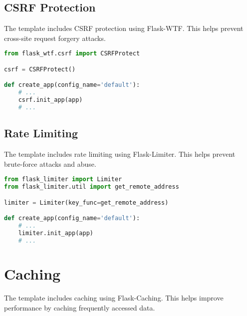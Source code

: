 \documentclass{article}
\begin{document}
\subsection{CSRF Protection}

The template includes CSRF protection using Flask-WTF. This helps prevent cross-site request forgery attacks.

\begin{lstlisting}[language=python, caption=CSRF Protection in app/\_\_init\_\_.py]
from flask_wtf.csrf import CSRFProtect

csrf = CSRFProtect()

def create_app(config_name='default'):
    # ...
    csrf.init_app(app)
    # ...
\end{lstlisting}

\subsection{Rate Limiting}

The template includes rate limiting using Flask-Limiter. This helps prevent brute-force attacks and abuse.

\begin{lstlisting}[language=python, caption=Rate Limiting in app/\_\_init\_\_.py]
from flask_limiter import Limiter
from flask_limiter.util import get_remote_address

limiter = Limiter(key_func=get_remote_address)

def create_app(config_name='default'):
    # ...
    limiter.init_app(app)
    # ...
\end{lstlisting}

\section{Caching}

The template includes caching using Flask-Caching. This helps improve performance by caching frequently accessed data.
\end{document}
